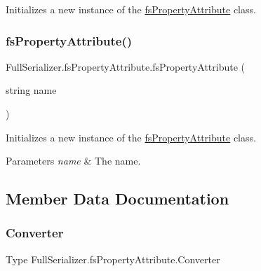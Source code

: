 Initializes a new instance of the \hyperlink{class_full_serializer_1_1fs_property_attribute}{fs\+Property\+Attribute} class. 

\mbox{\label{class_full_serializer_1_1fs_property_attribute_a2ea92a57d2bba0030b7dd6cd5b1d04f7}} 
\subsubsection{\texorpdfstring{fs\+Property\+Attribute()}{fsPropertyAttribute()}\hspace{0.1cm}{\footnotesize\ttfamily [2/2]}}
{\footnotesize\ttfamily Full\+Serializer.\+fs\+Property\+Attribute.\+fs\+Property\+Attribute (\begin{DoxyParamCaption}\item[{string}]{name }\end{DoxyParamCaption})\hspace{0.3cm}{\ttfamily [inline]}}



Initializes a new instance of the \hyperlink{class_full_serializer_1_1fs_property_attribute}{fs\+Property\+Attribute} class. 


\begin{DoxyParams}{Parameters}
{\em name} & The name.\\
\hline
\end{DoxyParams}


\subsection{Member Data Documentation}
\mbox{\label{class_full_serializer_1_1fs_property_attribute_aaaf462a84a2ab5cdca315894a11033bc}} 
\subsubsection{\texorpdfstring{Converter}{Converter}}
{\footnotesize\ttfamily Type Full\+Serializer.\+fs\+Property\+Attribute.\+Converter}



